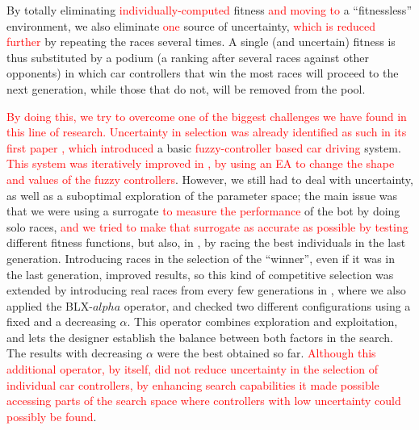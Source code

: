 \documentclass[10pt,journal,compsoc]{IEEEtran}
\begin{document}
By totally eliminating \textcolor{red}{individually-computed} fitness
\textcolor{red}{and moving to} a ``fitnessless'' environment, we also
eliminate \textcolor{red}{one} source of uncertainty,
\textcolor{red}{which is reduced further} by repeating the races
several times. A single (and uncertain) fitness is thus substituted by
a podium (a ranking after several races against other opponents) in
which car controllers that win the most races will proceed to the next
generation, while those that do not, will be removed from the
pool.

\textcolor{red}{By doing this, we try to overcome one of the biggest
challenges we have found in this line of research. Uncertainty in
selection was already identified as such in its first paper
\cite{salem_evo17}, which introduced} a basic
\textcolor{red}{fuzzy-controller based car driving}
system. \textcolor{red}{This system was iteratively improved in
\cite{salem_evo18,salem_cig2018}, by using an EA to change the shape
and values of the fuzzy controllers}. However, we still had to deal
with uncertainty, as well as a suboptimal exploration of the parameter
space; the main issue was that we were using a surrogate
\textcolor{red}{to measure the performance} of the bot by doing solo
races, \textcolor{red}{and we tried to make that surrogate as accurate as
  possible by testing} different
fitness functions, but also, in \cite{salem_cig2018}, by racing the best individuals in the last
generation. Introducing
races in the selection of the ``winner'', even if it was in the last
generation, improved results, so this kind of competitive selection
was extended by introducing real races from every few generations in
\cite{DBLP:conf/cig/SalemMG19}, where we also applied the BLX-$alpha$
operator, and checked two different configurations using a fixed and a
decreasing $\alpha$. This operator combines exploration and
exploitation, and lets the designer establish the balance between both factors in the search. The
results with decreasing $\alpha$ were the best obtained so
far. \textcolor{red}{Although this additional operator, by itself, did
  not reduce uncertainty in the selection of individual car
  controllers, by enhancing search capabilities it made possible
  accessing parts of the search space where controllers with low
  uncertainty could possibly be found}.
\end{document}
